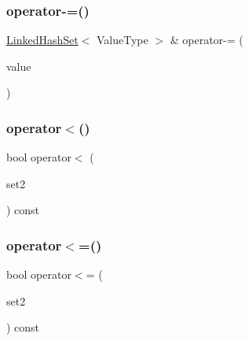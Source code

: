 \mbox{\label{classLinkedHashSet_a63fa21d43fbb341a6f6c62ecd782aad6}} 
\subsubsection{\texorpdfstring{operator-\/=()}{operator-=()}\hspace{0.1cm}{\footnotesize\ttfamily [3/3]}}
{\footnotesize\ttfamily \mbox{\hyperlink{classLinkedHashSet}{Linked\+Hash\+Set}}$<$ Value\+Type $>$ \& operator-\/= (\begin{DoxyParamCaption}\item[{const Value\+Type \&}]{value }\end{DoxyParamCaption})}

\mbox{\label{classLinkedHashSet_a57770c6cdcc29fb6fc0296b9659db256}} 
\subsubsection{\texorpdfstring{operator$<$()}{operator<()}}
{\footnotesize\ttfamily bool operator$<$ (\begin{DoxyParamCaption}\item[{const \mbox{\hyperlink{classLinkedHashSet}{Linked\+Hash\+Set}}$<$ Value\+Type $>$ \&}]{set2 }\end{DoxyParamCaption}) const}

\mbox{\label{classLinkedHashSet_aa11ca5dd8eb96e77103adc1172b1b2a6}} 
\subsubsection{\texorpdfstring{operator$<$=()}{operator<=()}}
{\footnotesize\ttfamily bool operator$<$= (\begin{DoxyParamCaption}\item[{const \mbox{\hyperlink{classLinkedHashSet}{Linked\+Hash\+Set}}$<$ Value\+Type $>$ \&}]{set2 }\end{DoxyParamCaption}) const}

